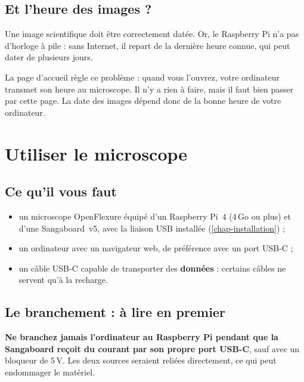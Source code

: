 \documentclass[11pt,a4paper,openany]{report}
\begin{document}
\section{Et l'heure des images ?}
Une image scientifique doit être correctement datée. Or, le Raspberry Pi n'a pas d'horloge à pile : sans Internet, il repart de la dernière heure connue, qui peut dater de plusieurs jours.

La page d'accueil règle ce problème : quand vous l'ouvrez, votre ordinateur transmet son heure au microscope. Il n'y a rien à faire, mais il faut bien passer par cette page. La date des images dépend donc de la bonne heure de votre ordinateur.

\chapter{Utiliser le microscope}

\section{Ce qu'il vous faut}
\begin{itemize}
  \item un microscope OpenFlexure équipé d'un Raspberry Pi~4 (4\,Go ou plus) et d'une Sangaboard~v5, avec la liaison USB installée (\cref{chap-installation}) ;
  \item un ordinateur avec un navigateur web, de préférence avec un port USB-C ;
  \item un câble USB-C capable de transporter des \textbf{données} : certains câbles ne servent qu'à la recharge.
\end{itemize}

\section{Le branchement : à lire en premier}
\begin{attention}
\textbf{Ne branchez jamais l'ordinateur au Raspberry Pi pendant que la Sangaboard reçoit du courant par son propre port USB-C}, sauf avec un bloqueur de 5\,V. Les deux sources seraient reliées directement, ce qui peut endommager le matériel.
\end{attention}
\end{document}
